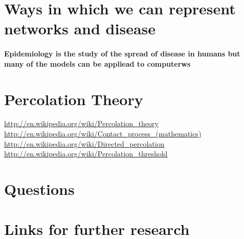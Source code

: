 \documentclass{article}
\begin{document}
\section{Ways in which we can represent networks and disease}
\paragraph{Epidemiology is the study of the spread of disease in humans but many of the models can be appliead to computerws}

\section{Percolation Theory}
\url{http://en.wikipedia.org/wiki/Percolation_theory }\\
\url{http://en.wikipedia.org/wiki/Contact_process_(mathematics)} \\
\url{http://en.wikipedia.org/wiki/Directed_percolation}\\
\url{http://en.wikipedia.org/wiki/Percolation_threshold}\\
\section{Questions}
\section{Links for further research}
\end{document}
